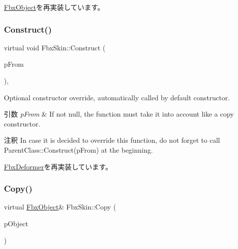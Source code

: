 \hyperlink{class_fbx_object_a2720f16a08150d162242b0c59f58c3dc}{Fbx\+Object}を再実装しています。

\mbox{\label{class_fbx_skin_aeebbc037507285cdb2e066f420970208}} 
\subsubsection{\texorpdfstring{Construct()}{Construct()}}
{\footnotesize\ttfamily virtual void Fbx\+Skin\+::\+Construct (\begin{DoxyParamCaption}\item[{const \hyperlink{class_fbx_object}{Fbx\+Object} $\ast$}]{p\+From }\end{DoxyParamCaption})\hspace{0.3cm}{\ttfamily [protected]}, {\ttfamily [virtual]}}

Optional constructor override, automatically called by default constructor. 
\begin{DoxyParams}{引数}
{\em p\+From} & If not null, the function must take it into account like a copy constructor. \\
\hline
\end{DoxyParams}
\begin{DoxyRemark}{注釈}
In case it is decided to override this function, do not forget to call Parent\+Class\+::\+Construct(p\+From) at the beginning. 
\end{DoxyRemark}


\hyperlink{class_fbx_deformer_ac50e8e0e8cfd2934f8f8cca2d69a6f58}{Fbx\+Deformer}を再実装しています。

\mbox{\label{class_fbx_skin_a858806922c36d1dc2910181a70a67d88}} 
\subsubsection{\texorpdfstring{Copy()}{Copy()}}
{\footnotesize\ttfamily virtual \hyperlink{class_fbx_object}{Fbx\+Object}\& Fbx\+Skin\+::\+Copy (\begin{DoxyParamCaption}\item[{const \hyperlink{class_fbx_object}{Fbx\+Object} \&}]{p\+Object }\end{DoxyParamCaption})\hspace{0.3cm}{\ttfamily [virtual]}}

